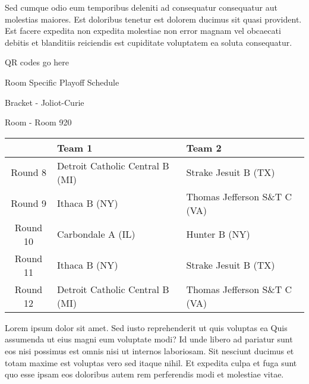 \documentclass{article}%
\begin{document}
\newline%
Sed cumque odio eum temporibus deleniti ad consequatur consequatur aut molestias maiores. Est doloribus tenetur est dolorem ducimus sit quasi provident. Est facere expedita non expedita molestiae non error magnam vel obcaecati debitis et blanditiis reiciendis est cupiditate voluptatem ea soluta consequatur.%
\vspace*{140pt}%
\begin{center}%
\begin{Huge}%
QR codes go here%
\end{Huge}%
\end{center}%
\newpage%
\begin{center}%
\begin{Huge}%
Room Specific Playoff Schedule%
\end{Huge}%
\vspace*{8pt}%
\linebreak%
\begin{Large}%
Bracket {-} Joliot{-}Curie%
\end{Large}%
\vspace*{8pt}%
\linebreak%
\vspace*{8pt}%
\begin{Large}%
Room {-} Room 920%
\end{Large}%
\end{center}%
%
\begin{tabularx}{\textwidth}{|c|Y|Y|}%
\hline%
&Team 1&Team 2\\%
\hline%
Round 8&Detroit Catholic Central B (MI)&Strake Jesuit B (TX)\\%
Round 9&Ithaca B (NY)&Thomas Jefferson S\&T C (VA)\\%
Round 10&Carbondale A (IL)&Hunter B (NY)\\%
Round 11&Ithaca B (NY)&Strake Jesuit B (TX)\\%
Round 12&Detroit Catholic Central B (MI)&Thomas Jefferson S\&T C (VA)\\%
\hline%
\end{tabularx}%
\vspace*{8pt}%
\newline%
Lorem ipsum dolor sit amet. Sed iusto reprehenderit ut quis voluptas ea Quis assumenda ut eius magni eum voluptate modi? Id unde libero ad pariatur sunt eos nisi possimus est omnis nisi ut internos laboriosam. Sit nesciunt ducimus et totam maxime est voluptas vero sed itaque nihil. Et expedita culpa et fuga sunt quo esse ipsam eos doloribus autem rem perferendis modi et molestiae vitae.\newline%
\end{document}
